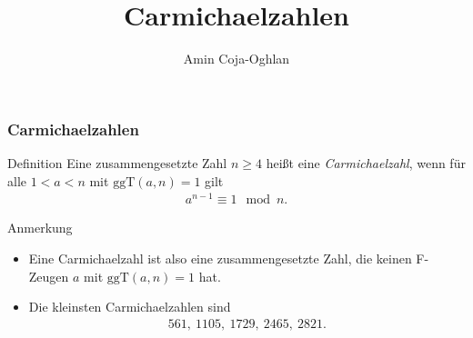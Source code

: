\documentclass{beamer}
\title[Linadi]{Carmichaelzahlen}
\author[Amin Coja-Oghlan]{Amin Coja-Oghlan}
\institute[Frankfurt]{JWGUFFM}
\date{}
\renewcommand{\emph}[1]{{\textcolor{solarizedRed}{\itshape #1}}}
\newcommand{\ggt}{\mathrm{ggT}}
\newcommand{\ue}{\"u}
\begin{document}
\frame[plain]{\titlepage}

\begin{frame}\frametitle{Carmichaelzahlen}
	\begin{block}{Definition}
		Eine zusammengesetzte Zahl $n\geq4$ hei\ss t eine \emph{Carmichaelzahl}, wenn f\ue r alle $1<a<n$ mit $\ggt(a,n)=1$ gilt
		\begin{align*}
			a^{n-1}\equiv1\mod n.
		\end{align*}
	\end{block}
	\begin{block}{Anmerkung}
	\begin{itemize}
		\item Eine Carmichaelzahl ist also eine zusammengesetzte Zahl, die keinen F-Zeugen $a$ mit $\ggt(a,n)=1$ hat.
		\item Die kleinsten Carmichaelzahlen sind
			\begin{align*}
			561,\ 1105,\ 1729,\ 2465,\ 2821.
			\end{align*}
	\end{itemize}	
	\end{block}
\end{frame}
\end{document}
